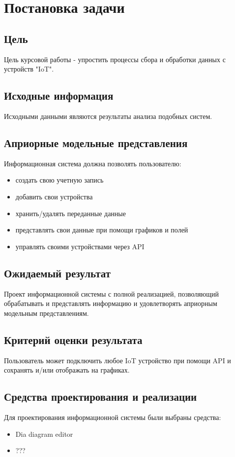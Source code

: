 \documentclass[12pt]{report}
\begin{document}
    \section{Постановка задачи}
    \subsection{Цель}
    Цель курсовой работы - упростить процессы сбора и обработки данных с устройств "IoT".
    \subsection{Исходные информация}
    Исходными данными являются результаты анализа подобных систем.
    \subsection{Априорные модельные представления}
    Информационная система должна позволять пользователю:
    \begin{itemize}
        \item создать свою учетную запись
        \item добавить свои устройства 
        \item хранить/удалять переданные данные
        \item представлять свои данные при помощи графиков и полей
        \item управлять своими устройствами через API
    \end{itemize}
    \subsection{Ожидаемый результат}
    Проект информационной системы с полной реализацией, позволяющий обрабатывать и представлять информацию
    и удовлетворять априорным модельным представлениям.
    \subsection{Критерий оценки результата}
    Пользователь может подключить любое IoT устройство при помощи API и сохранять и/или отображать на графиках.
    \subsection{Средства проектирования и реализации}
    Для проектирования информационной системы были выбраны средства:
    \begin{itemize}
        \item Dia diagram editor
        \item ???
    \end{itemize}
\end{document}
